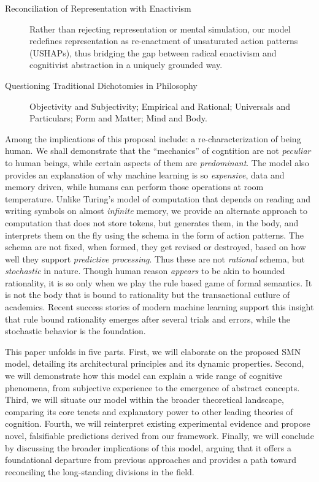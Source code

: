\begin{description}
    \item[Reconciliation of Representation with Enactivism]
    Rather than rejecting representation or mental simulation, our model redefines representation as re-enactment of unsaturated action patterns (USHAPs), thus bridging the gap between radical enactivism and cognitivist abstraction in a uniquely grounded way.

    \item[Questioning Traditional Dichotomies in Philosophy]
    Objectivity and Subjectivity; Empirical and Rational; Universals and Particulars; Form and Matter; Mind and Body.

\end{description}


Among the implications of this proposal include: a re-characterization of being human. We shall demonstrate that the ``mechanics'' of cogntition are not \textit{peculiar} to human beings, while certain aspects of them are \textit{predominant}. The model also provides an explanation of why machine learning is so \textit{expensive}, data and memory driven, while humans can perform those operations at room temperature. Unlike Turing's model of computation that depends on reading and writing symbols on almost \textit{infinite} memory, we provide an alternate approach to computation that does not store tokens, but generates them, in the body, and interprets them on the fly using the schema in the form of action patterns. The schema are not fixed, when formed, they get revised or destroyed, based on how well they support \textit{predictive processing}. Thus these are not \textit{rational} schema, but \textit{stochastic} in nature. Though human reason \textit{appears} to be akin to bounded rationality, it is so only when we play the rule based game of formal semantics. It is not the body that is bound to rationality but the transactional cutlure of academics. Recent success stories of modern machine learning support this insight that rule bound rationality emerges after several trials and errors, while the stochastic behavior is the foundation. 

This paper unfolds in five parts. First, we will elaborate on the proposed SMN model, detailing its architectural principles and its dynamic properties. Second, we will demonstrate how this model can explain a wide range of cognitive phenomena, from subjective experience to the emergence of abstract concepts. Third, we will situate our model within the broader theoretical landscape, comparing its core tenets and explanatory power to other leading theories of cognition. Fourth, we will reinterpret existing experimental evidence and propose novel, falsifiable predictions derived from our framework. Finally, we will conclude by discussing the broader implications of this model, arguing that it offers a foundational departure from previous approaches and provides a path toward reconciling the long-standing divisions in the field.
